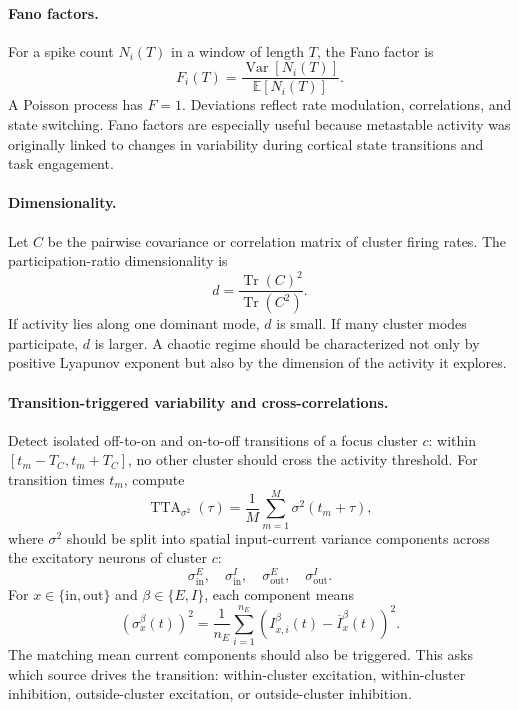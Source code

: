 \paragraph{Fano factors.}
For a spike count \(N_i(T)\) in a window of length \(T\), the Fano factor is
\begin{equation}
    F_i(T)
    =
    \frac{\operatorname{Var}[N_i(T)]}{\mathbb{E}[N_i(T)]}.
    \label{eq:ch10-fano}
\end{equation}
A Poisson process has \(F=1\). Deviations reflect rate modulation, correlations,
and state switching. Fano factors are especially useful because metastable
activity was originally linked to changes in variability during cortical state
transitions and task engagement.

\paragraph{Dimensionality.}
Let \(C\) be the pairwise covariance or correlation matrix of cluster firing
rates. The participation-ratio dimensionality is
\begin{equation}
    d
    =
    \frac{\operatorname{Tr}(C)^2}{\operatorname{Tr}(C^2)}.
    \label{eq:ch10-dimensionality}
\end{equation}
If activity lies along one dominant mode, \(d\) is small. If many cluster modes
participate, \(d\) is larger. A chaotic regime should be characterized not only
by positive Lyapunov exponent but also by the dimension of the activity it
explores.

\paragraph{Transition-triggered variability and cross-correlations.}
Detect isolated off-to-on and on-to-off transitions of a focus cluster \(c\):
within \([t_m-T_C,t_m+T_C]\), no other cluster should cross the activity
threshold. For transition times \(t_m\), compute
\begin{equation}
    \operatorname{TTA}_{\sigma^2}(\tau)
    =
    \frac{1}{M}\sum_{m=1}^M \sigma^2(t_m+\tau),
    \label{eq:ch10-tta-variability}
\end{equation}
where \(\sigma^2\) should be split into spatial input-current variance
components across the excitatory neurons of cluster \(c\):
\begin{equation}
    \sigma_{\mathrm{in}}^E,\quad
    \sigma_{\mathrm{in}}^I,\quad
    \sigma_{\mathrm{out}}^E,\quad
    \sigma_{\mathrm{out}}^I .
    \label{eq:ch10-transition-sigma-components}
\end{equation}
For \(x\in\{\mathrm{in},\mathrm{out}\}\) and \(\beta\in\{E,I\}\), each
component means
\begin{equation}
    \left(\sigma_x^\beta(t)\right)^2
    =
    \frac{1}{n_E}
    \sum_{i=1}^{n_E}
    \left(
        I_{x,i}^{\beta}(t)-\overline I_x^\beta(t)
    \right)^2 .
    \label{eq:ch10-transition-sigma-definition}
\end{equation}
The matching mean current components should also be triggered. This asks which
source drives the transition: within-cluster excitation, within-cluster
inhibition, outside-cluster excitation, or outside-cluster inhibition.

